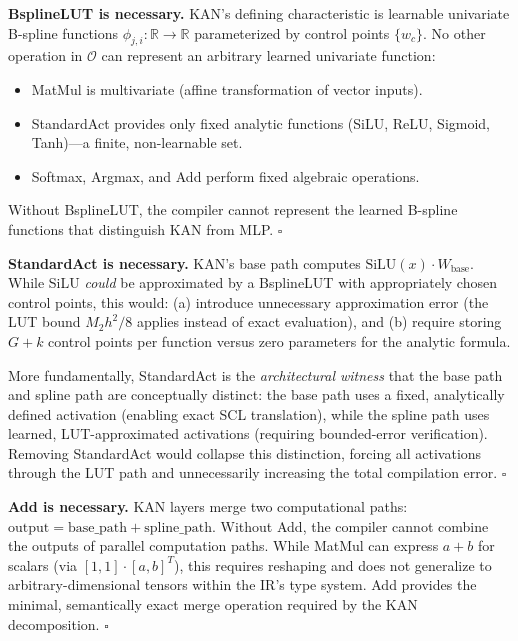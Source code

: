 \vspace{2pt}
\noindent\textbf{BsplineLUT is necessary.}
KAN's defining characteristic is learnable univariate B-spline functions
$\phi_{j,i}: \mathbb{R} \to \mathbb{R}$ parameterized by control points
$\{w_c\}$. No other operation in $\mathcal{O}$ can represent an arbitrary
learned univariate function:
\begin{itemize}
    \item MatMul is multivariate (affine transformation of vector inputs).
    \item StandardAct provides only fixed analytic functions (SiLU, ReLU,
    Sigmoid, Tanh)---a finite, non-learnable set.
    \item Softmax, Argmax, and Add perform fixed algebraic operations.
\end{itemize}
Without BsplineLUT, the compiler cannot represent the learned B-spline
functions that distinguish KAN from MLP. $\square$

\vspace{2pt}
\noindent\textbf{StandardAct is necessary.}
KAN's base path computes $\text{SiLU}(x) \cdot W_{\text{base}}$.
While SiLU \textit{could} be approximated by a BsplineLUT with
appropriately chosen control points, this would:
(a) introduce unnecessary approximation error (the LUT bound
$M_2 h^2 / 8$ applies instead of exact evaluation), and
(b) require storing $G + k$ control points per function versus
zero parameters for the analytic formula.

More fundamentally, StandardAct is the \textit{architectural witness}
that the base path and spline path are conceptually distinct: the
base path uses a fixed, analytically defined activation (enabling
exact SCL translation), while the spline path uses learned,
LUT-approximated activations (requiring bounded-error verification).
Removing StandardAct would collapse this distinction, forcing all
activations through the LUT path and unnecessarily increasing the
total compilation error. $\square$

\vspace{2pt}
\noindent\textbf{Add is necessary.}
KAN layers merge two computational paths:
$\text{output} = \text{base\_path} + \text{spline\_path}$.
Without Add, the compiler cannot combine the outputs of parallel
computation paths. While MatMul can express $a + b$ for scalars
(via $[1,1] \cdot [a,b]^T$), this requires reshaping and does not
generalize to arbitrary-dimensional tensors within the IR's type
system. Add provides the minimal, semantically exact merge operation
required by the KAN decomposition. $\square$


